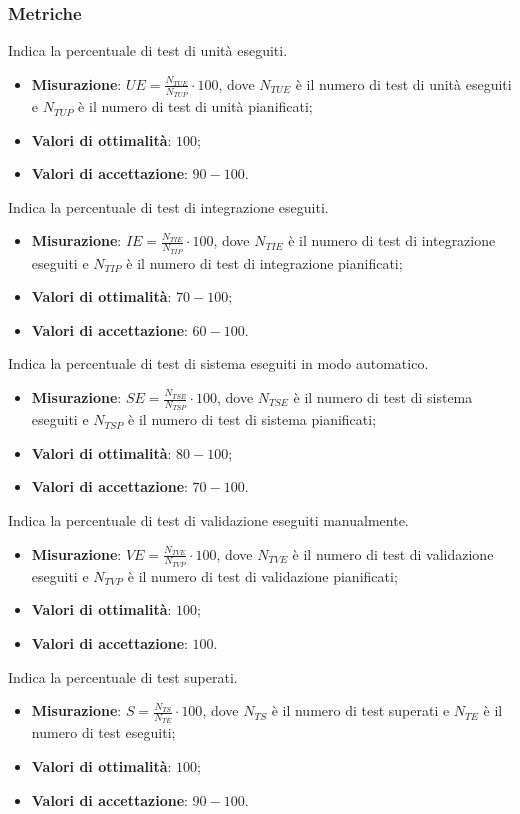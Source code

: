\subsubsection{Metriche}
\label{tuniese}
Indica la percentuale di test di unità eseguiti.
\begin{itemize}
\item \textbf{Misurazione}: $UE=\frac{N_{TUE}}{N_{TUP}} \cdot 100$, dove $N_{TUE}$ è il numero di test di unità eseguiti e $N_{TUP}$ è il numero di test di unità pianificati;
\item \textbf{Valori di ottimalità}: $100$;
\item \textbf{Valori di accettazione}: $90 - 100$.
\end{itemize}
\label{tintese}
Indica la percentuale di test di integrazione eseguiti.
\begin{itemize}
\item \textbf{Misurazione}: $IE=\frac{N_{TIE}}{N_{TIP}} \cdot 100$, dove $N_{TIE}$ è il numero di test di integrazione eseguiti e $N_{TIP}$ è il numero di test di integrazione pianificati;
\item \textbf{Valori di ottimalità}: $70 - 100$;
\item \textbf{Valori di accettazione}: $60 - 100$.
\end{itemize}
\label{tsissup}
Indica la percentuale di test di sistema eseguiti in modo automatico.
\begin{itemize}
\item \textbf{Misurazione}: $SE=\frac{N_{TSE}}{N_{TSP}} \cdot 100$, dove $N_{TSE}$ è il numero di test di sistema eseguiti e $N_{TSP}$ è il numero di test di sistema pianificati;
\item \textbf{Valori di ottimalità}: $80 - 100$;
\item \textbf{Valori di accettazione}: $70 - 100$.
\end{itemize}
\label{tvalese}
Indica la percentuale di test di validazione eseguiti manualmente.
\begin{itemize}
\item \textbf{Misurazione}: $VE=\frac{N_{TVE}}{N_{TVP}} \cdot 100$, dove $N_{TVE}$ è il numero di test di validazione eseguiti e $N_{TVP}$ è il numero di test di validazione pianificati;
\item \textbf{Valori di ottimalità}: $100$;
\item \textbf{Valori di accettazione}: $100$.
\end{itemize}
\label{tsuperati}
Indica la percentuale di test superati.
\begin{itemize}
\item \textbf{Misurazione}: $S=\frac{N_{TS}}{N_{TE}} \cdot 100$, dove $N_{TS}$ è il numero di test superati e $N_{TE}$ è il numero di test eseguiti;
\item \textbf{Valori di ottimalità}: $100$;
\item \textbf{Valori di accettazione}: $90 - 100$.
\end{itemize}

